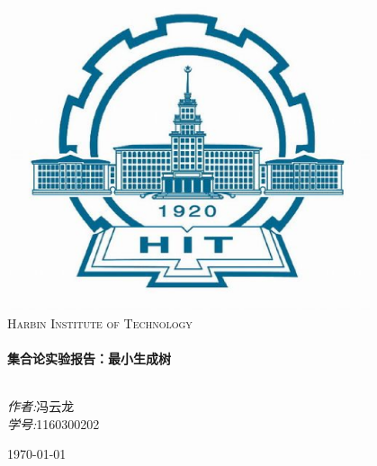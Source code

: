 \documentclass[a4paper,10pt]{ctexart}
\begin{document}
\begin{titlepage}

\begin{center}


\includegraphics[width=0.8\textwidth]{../Pics/HIT.eps}\\[1cm]

\textsc{\LARGE Harbin Institute of Technology}\\[1.5cm]

\hrulefill \\[0.4cm]
{ \huge \bfseries 集合论实验报告：最小生成树}\\[0.4cm]
\hrulefill \\[1.5cm]

\begin{minipage}{0.4\textwidth}
\begin{flushleft} \large
\end{flushleft}
\end{minipage}
\begin{minipage}{0.4\textwidth}
\begin{flushright} \large
\emph{作者:}冯云龙 \\
\emph{学号:}1160300202
\end{flushright}
\end{minipage}

\vfill

{\large \today}

\end{center}
\end{titlepage}
\end{document}
